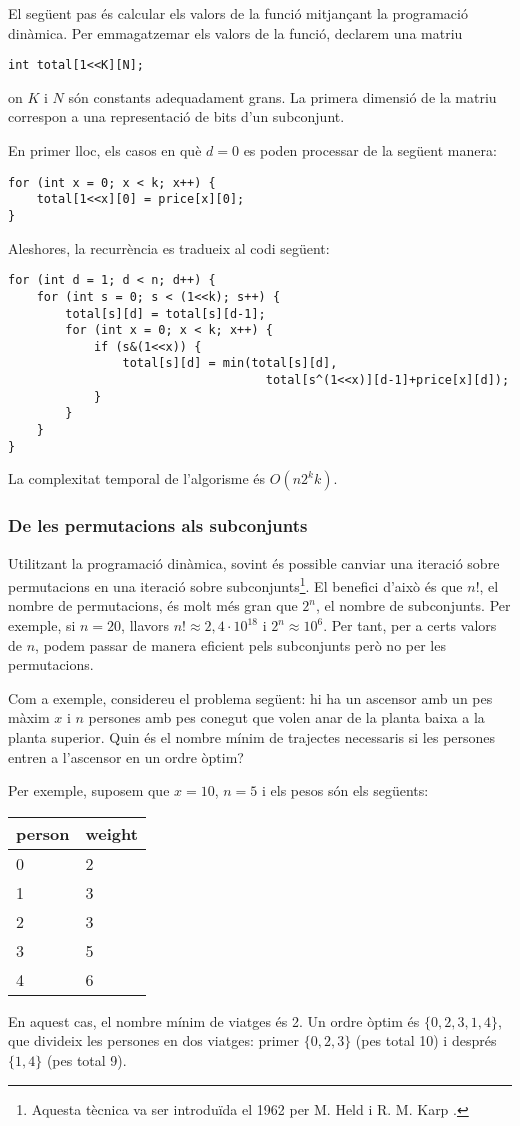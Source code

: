 El següent pas és calcular els valors de la funció mitjançant la
programació dinàmica. Per emmagatzemar els valors de la funció,
declarem una matriu
\begin{lstlisting}
int total[1<<K][N];
\end{lstlisting}
on $K$ i $N$ són constants adequadament grans.  La primera dimensió de
la matriu correspon a una representació de bits d'un subconjunt.

En primer lloc, els casos en què $d=0$ es poden processar de la
següent manera:
\begin{lstlisting}
for (int x = 0; x < k; x++) {
    total[1<<x][0] = price[x][0];
}
\end{lstlisting}
Aleshores, la recurrència es tradueix al codi següent:
\begin{lstlisting}
for (int d = 1; d < n; d++) {
    for (int s = 0; s < (1<<k); s++) {
        total[s][d] = total[s][d-1];
        for (int x = 0; x < k; x++) {
            if (s&(1<<x)) {
                total[s][d] = min(total[s][d],
                                    total[s^(1<<x)][d-1]+price[x][d]);
            }
        }
    }
}
\end{lstlisting}
La complexitat temporal de l'algorisme és $O(n 2^k k)$.

\subsubsection{De les permutacions als subconjunts}

Utilitzant la programació dinàmica, sovint és possible canviar una
iteració sobre permutacions en una iteració sobre
subconjunts\footnote{Aquesta tècnica va ser introduïda el 1962 per
M. Held i R. M. Karp \cite{hel62}.}. El benefici d'això és que $n!$,
el nombre de permutacions, és molt més gran que $2^n$, el nombre de
subconjunts. Per exemple, si $n=20$, llavors $n! \approx 2,4 \cdot
10^{18}$ i $2^n \approx 10^6$. Per tant, per a certs valors de $n$,
podem passar de manera eficient pels subconjunts però no per les
permutacions.

Com a exemple, considereu el problema següent: hi ha un ascensor amb
un pes màxim $x$ i $n$ persones amb pes conegut que volen anar de la
planta baixa a la planta superior. Quin és el nombre mínim de
trajectes necessaris si les persones entren a l'ascensor en un ordre
òptim?

Per exemple, suposem que $x=10$, $n=5$ i els pesos són els següents:
\begin{center}
\begin{tabular}{ll}
person & weight \\
\hline
0 & 2 \\
1 & 3 \\
2 & 3 \\
3 & 5 \\
4 & 6 \\
\end{tabular}
\end{center}
En aquest cas, el nombre mínim de viatges és 2. Un ordre òptim és
$\{0,2,3,1,4\}$, que divideix les persones en dos viatges: primer
$\{0,2,3\}$ (pes total 10) i després $\{1,4\}$ (pes total 9).

